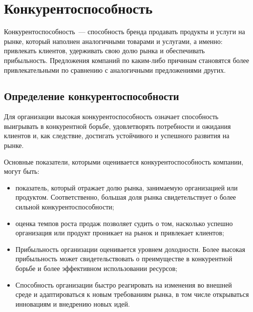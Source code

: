 \chapter{Конкурентоспособность}

Конкурентоспособность~--- способность бренда продавать продукты и услуги на рынке, который наполнен аналогичными товарами и услугами, а именно: привлекать клиентов, удерживать свою долю рынка и обеспечивать прибыльность. 
Предложения компаний по каким-либо причинам становятся более привлекательными по сравнению с аналогичными предложениями других.

\section{Определение конкурентоспособности}
Для организации высокая конкурентоспособность означает способность выигрывать в конкурентной борьбе, удовлетворять потребности и ожидания клиентов и, как следствие, достигать устойчивого и успешного развития на рынке.

Основные показатели, которыми оценивается конкурентоспособность компании, могут быть:
\begin{itemize}
	\item показатель, который отражает долю рынка, занимаемую организацией или продуктом. 
	Соответственно, большая доля рынка свидетельствует о более сильной конкурентоспособности;
	\item оценка темпов роста продаж позволяет судить о том, насколько успешно организация или продукт проникает на рынок и привлекает клиентов;
	\item Прибыльность организации оценивается уровнем доходности. 
	Более высокая прибыльность может свидетельствовать о преимуществе в конкурентной борьбе и более эффективном использовании ресурсов;
	\item Способность организации быстро реагировать на изменения во внешней среде и адаптироваться к новым требованиям рынка, в том числе открываться инновациям и внедрению новых идей.
\end{itemize}

